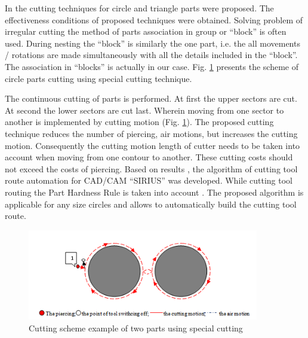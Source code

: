 \documentclass[runningheads]{llncs}
\begin{document}
In \cite{ru26} the cutting techniques for circle and triangle parts were proposed.
The effectiveness conditions of proposed techniques were obtained.
Solving problem of irregular cutting the method of parts association
in group or ``block'' is often used.
During nesting the ``block'' is similarly the one part,
i.e. the all movements / rotations are made simultaneously
with all the details included in the ``block''.
The association in ``blocks'' is actually in our case.
Fig. \ref{8} presents the scheme of circle parts cutting using special cutting technique.

The continuous cutting of parts is performed.
At first the upper sectors are cut.
At second the lower sectors are cut last.
Wherein moving from one sector to another is implemented by cutting motion (Fig. \ref{8}).
The proposed cutting technique reduces the number of piercing, air motions,
but increases the cutting motion.
Consequently the cutting motion length of cutter needs to be taken into account
when moving from one contour to another.
These cutting costs should not exceed the costs of piercing.
Based on results \cite{ru26},
the algorithm of cutting tool route automation for CAD/CAM ``SIRIUS'' was developed.
While cutting tool routing the Part Hardness Rule is taken into account \cite{ru27}.
The proposed algorithm is applicable for any size circles
and allows to automatically build the cutting tool route.

\begin{figure}
  \begin{center}
  \includegraphics[width=0.9\textwidth]{8.png}
  \caption{Cutting scheme example of two parts using special cutting}
  \label{8}
  \end{center}
\end{figure}
\end{document}
